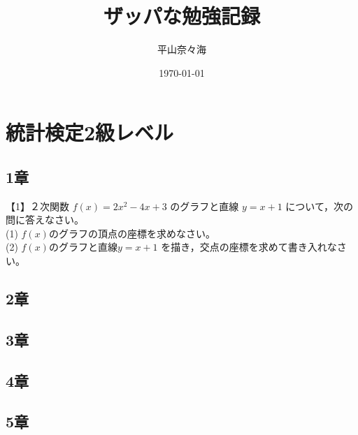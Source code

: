 \documentclass{article}
\title{ザッパな勉強記録}
\author{平山奈々海}
\date{\today}
\begin{document}
\maketitle
\section{統計検定2級レベル}
\subsection{1章}
【1】２次関数 $f(x)=2x^2-4x+3$ のグラフと直線 $y=x+1$ について，次の問に答えなさい。\\
(1) $f(x)$のグラフの頂点の座標を求めなさい。\\
(2) $f(x)$のグラフと直線$y=x+1$ を描き，交点の座標を求めて書き入れなさい。\\

\subsection{2章}
\subsection{3章}
\subsection{4章}
\subsection{5章}
\end{document}
